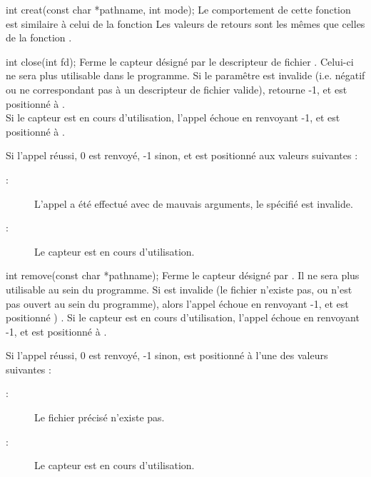 \documentclass[11pt, a4paper]{article}
\begin{document}
{int creat(const char *pathname, int mode);}
{Le comportement de cette fonction est similaire à celui de la fonction }
{Les valeurs de retours sont les mêmes que celles de la fonction .}

{int close(int fd);}
{Ferme le capteur désigné par le descripteur de fichier . Celui-ci ne sera plus utilisable dans le programme.
Si le paramêtre  est invalide (i.e. négatif ou ne correspondant pas à un descripteur de fichier valide),  retourne -1, et  est positionné à .\\
Si le capteur est en cours d'utilisation, l'appel échoue en renvoyant -1, et  est positionné à .}
{Si l'appel réussi, 0 est renvoyé, -1 sinon, et  est positionné aux valeurs suivantes :
\begin{description}
	\item[ : ] L'appel a été effectué avec de mauvais arguments, le  spécifié est invalide.
	\item[ : ] Le capteur est en cours d'utilisation.
\end{description}
}

{int remove(const char *pathname);}
{Ferme le capteur désigné par . Il ne sera plus utilisable au sein du programme.
Si  est invalide (le fichier n'existe pas, ou n'est pas ouvert au sein du programme), alors l'appel échoue en renvoyant -1, et  est positionné ) .
Si le capteur est en cours d'utilisation, l'appel échoue en renvoyant -1, et  est positionné à .}
{Si l'appel réussi, 0 est renvoyé, -1 sinon,  est positionné à l'une des valeurs suivantes :
\begin{description}
	\item[ : ] Le fichier précisé n'existe pas.
	\item[ : ] Le capteur est en cours d'utilisation.
\end{description}
}
\end{document}
